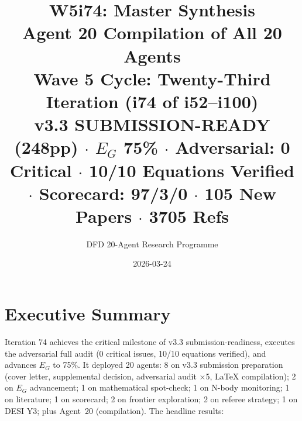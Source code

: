 \documentclass[11pt,a4paper]{article}
\title{\Huge W5i74: Master Synthesis\\[12pt]
\Large Agent 20 Compilation of All 20 Agents\\[6pt]
\large Wave 5 Cycle: Twenty-Third Iteration (i74 of i52--i100)\\[6pt]
\normalsize \textbf{v3.3 SUBMISSION-READY (248pp)} $\cdot$ $E_G$ 75\% $\cdot$ Adversarial: 0 Critical $\cdot$ 10/10 Equations Verified $\cdot$ Scorecard: 97/3/0 $\cdot$ 105 New Papers $\cdot$ 3705 Refs}
\author{DFD 20-Agent Research Programme}
\date{2026-03-24}
\begin{document}
\maketitle

\section{Executive Summary}

Iteration 74 achieves the critical milestone of v3.3 submission-readiness, executes the adversarial full audit (0 critical issues, 10/10 equations verified), and advances $E_G$ to 75\%. It deployed 20 agents: 8 on v3.3 submission preparation (cover letter, supplemental decision, adversarial audit $\times$5, LaTeX compilation); 2 on $E_G$ advancement; 1 on mathematical spot-check; 1 on N-body monitoring; 1 on literature; 1 on scorecard; 2 on frontier exploration; 2 on referee strategy; 1 on DESI Y3; plus Agent~20 (compilation). The headline results:
\end{document}
